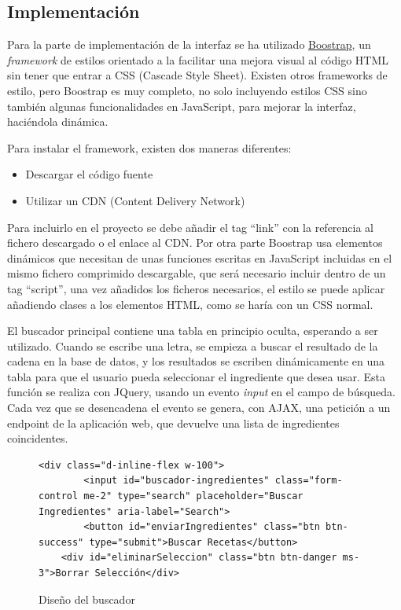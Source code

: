 \subsection{Implementación}
Para la parte de implementación de la interfaz se ha utilizado \href{https://getbootstrap.com/}{Boostrap}, un \emph{\gls{framework}} de estilos orientado a la facilitar una mejora visual al código \gls{HTML} sin tener que entrar a \gls{CSS} (Cascade Style Sheet). Existen otros \gls{frameworks} de estilo, pero Boostrap es muy completo, no solo incluyendo estilos \gls{CSS} sino también algunas funcionalidades en JavaScript, para mejorar la interfaz, haciéndola dinámica.

Para instalar el \gls{framework}, existen dos maneras diferentes:
\begin{itemize}
    \item Descargar el código fuente
    \item Utilizar un \gls{CDN} (Content Delivery Network)
\end{itemize}

Para incluirlo en el proyecto se debe añadir el \gls{tag} ``link'' con la referencia al fichero descargado o el enlace al \gls{CDN}. Por otra parte Boostrap usa elementos dinámicos que necesitan de unas funciones escritas en JavaScript incluidas en el mismo fichero comprimido descargable, que será necesario incluir dentro de un \gls{tag} ``script'', una vez añadidos los ficheros necesarios, el estilo se puede aplicar añadiendo clases a los elementos \gls{HTML}, como se haría con un \gls{CSS} normal.

El buscador principal contiene una tabla en principio oculta, esperando a ser utilizado. Cuando se escribe una letra, se empieza a buscar el resultado de la cadena en la base de datos, y los resultados se escriben dinámicamente en una tabla para que el usuario pueda seleccionar el ingrediente que desea usar. Esta función se realiza con \gls{JQuery}, usando un evento \textit{input} en el campo de búsqueda. Cada vez que se desencadena el evento se genera, con \gls{AJAX}, una petición a un \gls{endpoint} de la aplicación web, que devuelve una lista de ingredientes coincidentes.
\begin{figure}[h!]
\centering
{}
\label{fig:buscador}
\begin{lstlisting}[style=consola]
    <div class="d-inline-flex w-100">
        <input id="buscador-ingredientes" class="form-control me-2" type="search" placeholder="Buscar Ingredientes" aria-label="Search">
        <button id="enviarIngredientes" class="btn btn-success" type="submit">Buscar Recetas</button>
    <div id="eliminarSeleccion" class="btn btn-danger ms-3">Borrar Selección</div>
\end{lstlisting}
\caption{Diseño del buscador}
\end{figure}

